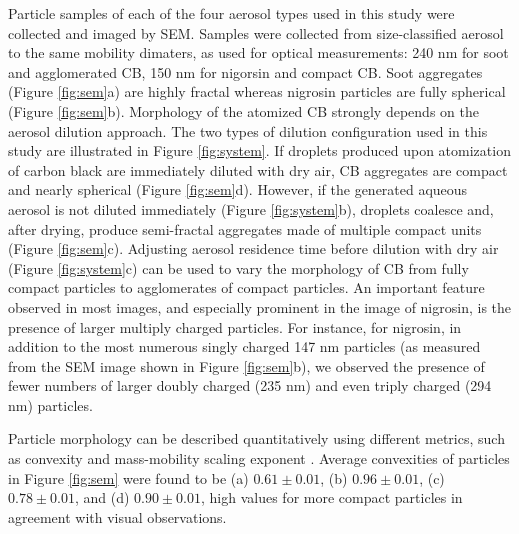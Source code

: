 Particle samples of each of the four aerosol types used in this study were collected and imaged by SEM. Samples were collected from size-classified aerosol to the same mobility dimaters, as used for optical measurements: 240 nm for soot and agglomerated CB, 150 nm for nigorsin and compact CB. Soot aggregates (Figure \ref{fig:sem}a) are highly fractal whereas nigrosin particles are fully spherical (Figure \ref{fig:sem}b). Morphology of the atomized CB strongly depends on the aerosol dilution approach. The two types of dilution configuration used in this study are illustrated in Figure \ref{fig:system}. If droplets produced upon atomization of carbon black are immediately diluted with dry air, CB aggregates are compact and nearly spherical (Figure \ref{fig:sem}d). However, if the generated aqueous aerosol is not diluted immediately (Figure \ref{fig:system}b), droplets coalesce and, after drying, produce semi-fractal aggregates made of multiple compact units (Figure \ref{fig:sem}c). Adjusting aerosol residence time before dilution with dry air (Figure \ref{fig:system}c) can be used to vary the morphology of CB from fully compact particles to agglomerates of compact particles. An important feature observed in most images, and especially prominent in the image of nigrosin, is the presence of larger multiply charged particles. For instance, for nigrosin, in addition to the most numerous singly charged 147 nm particles (as measured from the SEM image shown in Figure \ref{fig:sem}b), we observed the presence of fewer numbers of larger doubly charged (235 nm) and even triply charged (294 nm) particles.

Particle morphology can be described quantitatively using different metrics, such as convexity and mass-mobility scaling exponent \citep{RN69}. Average convexities of particles in Figure \ref{fig:sem} were found to be (a) $0.61\pm 0.01$, (b) $0.96\pm 0.01$, (c) $0.78\pm 0.01$, and (d) $0.90\pm 0.01$, high values for more compact particles in agreement with visual observations.

